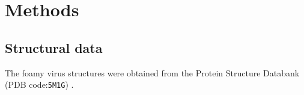 \section{Methods}

\subsection{Structural data}

The foamy virus structures were obtained from the Protein Structure Databank
(PDB code:{\tt 5M1G}) \cite{BallNJet16}.

%
%


